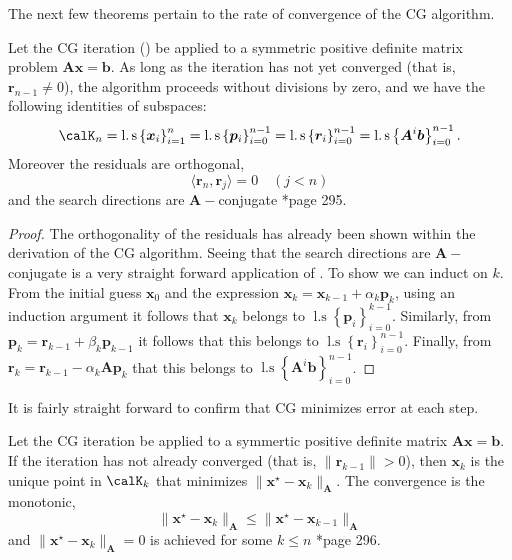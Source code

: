 The next few theorems pertain to the rate of convergence of the CG algorithm.

\begin{thm} \label{theorem: equiv-CG-spaces}
    Let the CG iteration () be applied to a symmetric positive definite matrix problem $\bm{A} \bm{x} = \bm{b}$. As long as the iteration has not yet converged (that is, $\bm{r}_{n-1} \neq 0$), the algorithm proceeds without divisions by zero, and we have the following identities of subspaces:
    \begin{equation} \label{eq: equiv-CG-spaces}
        \calK_n                                                  = \operatorname{l.s} \left\{ \bm{x}_i \right\}_{i=1}^{n} = \operatorname{l.s} \left\{ \bm{p}_i \right\}_{i=0}^{n-1} = \operatorname{l.s} \left\{ \bm{r}_i \right\}_{i=0}^{n-1} = \operatorname{l.s} \left\{ \bm{A}^{i} \bm{b} \right\}_{i=0}^{n-1}.
    \end{equation}
    Moreover the residuals are orthogonal,
    \begin{equation*}
        \langle \bm{r}_{n} , \bm{r}_{j} \rangle = 0 \quad (j<n)
    \end{equation*}
    and the search directions are $\bm{A}-$conjugate \cite{TrefethenLloydN.LloydNicholas1997Nla/}*{page 295}.
\end{thm}

\begin{proof}
    The orthogonality of the residuals has already been shown within the derivation of the CG algorithm. Seeing that the search directions are $\bm{A}-$conjugate is a very straight forward application of . To show  we can induct on $k$. From the initial guess $\bm{x}_0$ and the expression $\bm{x}_k = \bm{x}_{k-1} + \alpha_k \bm{p}_k$, using an induction argument it follows that $\bm{x}_k$ belongs to $\operatorname{l.s} \left\{ \bm{p}_i \right\}_{i=0}^{k-1}$. Similarly, from $\bm{p}_k = \bm{r}_{k-1} + \beta_k \bm{p}_{k-1}$ it follows that this belongs to $\operatorname{l.s} \left\{ \bm{r}_i \right\}_{i=0}^{n-1}$. Finally, from $\bm{r}_k = \bm{r}_{k-1} - \alpha_k \bm{A} \bm{p}_k$ that this belongs to $\operatorname{l.s} \left\{ \bm{A}^{i} \bm{b} \right\}_{i=0}^{n-1}$.
\end{proof}

It is fairly straight forward to confirm that CG minimizes error at each step.

\begin{thm} \label{theorem: CG-error-min}
    Let the CG iteration be applied to a symmertic positive definite matrix $\bm{A} \bm{x} = \bm{b}$. If the iteration has not already converged (that is, $\| \bm{r}_{k-1} \| > 0 $), then $\bm{x}_{k}$ is the unique point in $\calK_{k}$ that minimizes $\| \bm{x}^{\star} - \bm{x}_{k} \|_{\bm{A}}$. The convergence is the monotonic,
    \[
        \| \bm{x}^{\star} - \bm{x}_{k} \|_{\bm{A}} \leq \| \bm{x}^{\star} - \bm{x}_{k-1} \|_{\bm{A}}
    \]
    and $\| \bm{x}^{\star} - \bm{x}_{k} \|_{\bm{A}} = 0$ is achieved for some $k \leq n$ \cite{TrefethenLloydN.LloydNicholas1997Nla/}*{page 296}.
\end{thm}

